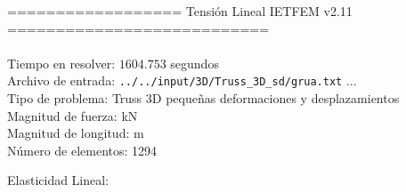 \documentclass[a4paper,11pt]{article}
\begin{document}

================== Tensión Lineal IETFEM v2.11 ===========================\\\\


Tiempo en resolver: $1604.753$ segundos \\

Archivo de entrada: \verb|../../input/3D/Truss_3D_sd/grua.txt|  ... \\

Tipo de problema: Truss 3D pequeñas deformaciones y desplazamientos\\ 

Magnitud de fuerza: kN \\

Magnitud de longitud: m \\

Número de elementos: 1294 \\

\newpage       

Elasticidad Lineal:\\
\end{document}
